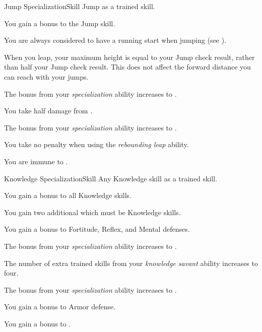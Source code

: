     \begin{feat}{Jump Specialization}{Skill}
        \featpre Jump as a trained skill.

         You gain a  bonus to the Jump skill.

         You are always considered to have a running start when jumping (see ).

         When you leap, your maximum height is equal to your Jump check result, rather than half your Jump check result.
        This does not affect the forward distance you can reach with your jumps.

         The bonus from your \textit{specialization} ability increases to .

         You take half damage from .

         The bonus from your \textit{specialization} ability increases to .

         You take no penalty when using the \textit{rebounding leap} ability.

         You are immune to .
    \end{feat}

    \begin{feat}{Knowledge Specialization}{Skill}
        \featpre Any Knowledge skill as a trained skill.

         You gain a  bonus to all Knowledge skills.

         You gain two additional  which must be Knowledge skills.

         You gain a  bonus to Fortitude, Reflex, and Mental defenses. 

         The bonus from your \textit{specialization} ability increases to .

         The number of extra trained skills from your \textit{knowledge savant} ability increases to four.

         The bonus from your \textit{specialization} ability increases to .

         You gain a  bonus to Armor defense.

         You gain a  bonus to .
    \end{feat}

